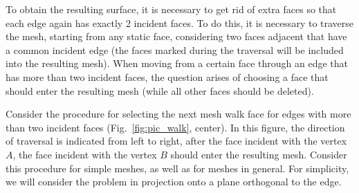 \documentclass[
11pt,%
tightenlines,%
twoside,%
onecolumn,%
nofloats,%
nobibnotes,%
nofootinbib,%
superscriptaddress,%
noshowpacs,%
centertags]%
{revtex4-2}
\begin{document}
To obtain the resulting surface, it is necessary to get rid of extra faces so that each edge again has exactly 2 incident faces.
To do this, it is necessary to traverse the mesh, starting from any static face, considering two faces adjacent that have a common incident edge (the faces marked during the traversal will be included into the resulting mesh).
When moving from a certain face through an edge that has more than two incident faces, the question arises of choosing a face that should enter the resulting mesh (while all other faces should be deleted).

Consider the procedure for selecting the next mesh walk face for edges with more than two incident faces (Fig.~\ref{fig:pic_walk}, center).
In this figure, the direction of traversal is indicated from left to right, after the face incident with the vertex $A$, the face incident with the vertex $B$ should enter the resulting mesh.
Consider this procedure for simple meshes, as well as for meshes in general.
For simplicity, we will consider the problem in projection onto a plane orthogonal to the edge.
\end{document}
